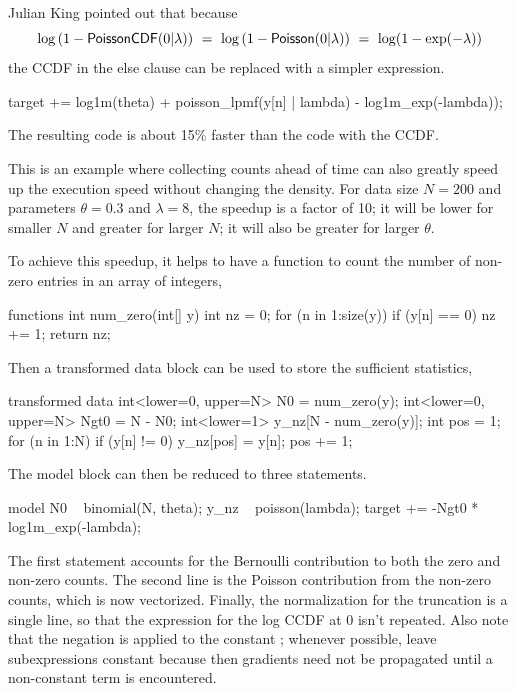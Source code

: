 Julian King pointed out that because
\[
\log \left( 1 - \mbox{\sf PoissonCDF}(0 | \lambda) \right)
\ = \ \log \left( 1 - \mbox{\sf Poisson}(0 | \lambda) \right)
\ = \ \log(1 - \exp(-\lambda))
\]
the CCDF in the else clause can be replaced with a simpler expression.
%
\begin{stancode}
      target += log1m(theta) + poisson_lpmf(y[n] | lambda)
                - log1m_exp(-lambda));
\end{stancode}
%
The resulting code is about 15\% faster than the code with the CCDF.

This is an example where collecting counts ahead of time can also
greatly speed up the execution speed without changing the density.
For data size $N=200$ and parameters $\theta=0.3$ and $\lambda = 8$,
the speedup is a factor of 10; it will be lower for smaller $N$ and
greater for larger $N$; it will also be greater for larger $\theta$.

To achieve this speedup, it helps to have a function to count the
number of non-zero entries in an array of integers,
%
\begin{stancode}
functions {
  int num_zero(int[] y) {
    int nz = 0;
    for (n in 1:size(y))
      if (y[n] == 0)
        nz += 1;
    return nz;
  }
}
\end{stancode}
%
Then a transformed data block can be used to store the sufficient
statistics,
%
\begin{stancode}
transformed data {
  int<lower=0, upper=N> N0 = num_zero(y);
  int<lower=0, upper=N> Ngt0 = N - N0;
  int<lower=1> y_nz[N - num_zero(y)];
  {
    int pos = 1;
    for (n in 1:N) {
      if (y[n] != 0) {
        y_nz[pos] = y[n];
        pos += 1;
      }
    }
  }
}
\end{stancode}
%
The model block can then be reduced to three statements.
%
\begin{stancode}
model {
  N0 ~ binomial(N, theta);
  y_nz ~ poisson(lambda);
  target += -Ngt0 * log1m_exp(-lambda);
}
\end{stancode}
%
The first statement accounts for the Bernoulli contribution to both
the zero and non-zero counts.  The second line is the Poisson
contribution from the non-zero counts, which is now vectorized.
Finally, the normalization for the truncation is a single line, so
that the expression for the log CCDF at 0 isn't repeated.  Also note
that the negation is applied to the constant ; whenever
possible, leave subexpressions constant because then gradients need
not be propagated until a non-constant term is encountered.


